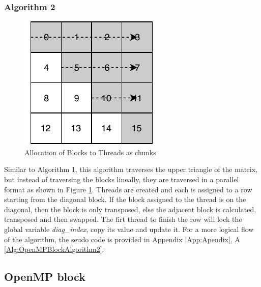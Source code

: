 \documentclass[10pt, onecolumn]{article}
\begin{document}
\subsubsection{Algorithm 2}
%
\begin{figure}[H]
    \centering
    \includegraphics{Documentation/BlockAlgorithm2ThreadAllocation.pdf}
    \caption{Allocation of Blocks to Threads as chunks}
    \label{fig:BlockAlgorithm2ThreadAllocation}
\end{figure}
%
Similar to Algorithm 1, this algorithm traverses the upper triangle of the matrix, but instead of traversing the blocks lineally, they are traversed in a parallel format as shown in Figure \ref{fig:BlockAlgorithm2ThreadAllocation}. Threads are created and each is assigned to a row starting from the diagonal block. If the block assigned to the thread is on the diagonal, then the block is only transposed, else the adjacent block is calculated, transposed and then swapped. The firt thread to finish the row will lock the global variable \emph{diag\_index}, copy its value and update it. For a more logical flow of the algorithm, the seudo code is provided in Appendix \ref{App:Apendix}, A \ref{Alg:OpenMPBlockAlgorithm2}. 
\subsection{OpenMP block}
%
 
%
%
\end{document}
